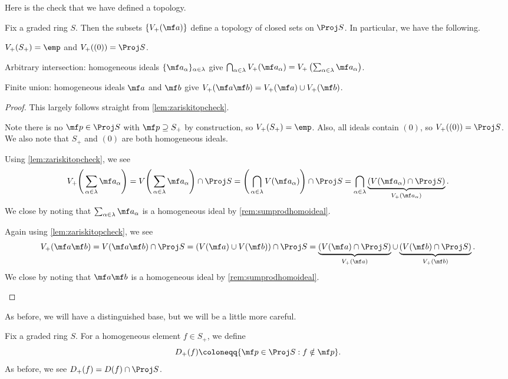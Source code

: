 \documentclass[../notes.tex]{subfiles}
\begin{document}
Here is the check that we have defined a topology.
\begin{lemma} \label{lem:zariskitopcheckproj}
	Fix a graded ring $S$. Then the subsets $\{V_+(\mf a)\}$ define a topology of closed sets on $\Proj S$. In particular, we have the following.
	\begin{listalph}
		\item $V_+(S_+)=\emp$ and $V_+((0))=\Proj S$.
		\item Arbitrary intersection: homogeneous ideals $\{\mf a_\alpha\}_{\alpha\in\lambda}$ give $\bigcap_{\alpha\in\lambda}V_+(\mf a_\alpha)=V_+\left(\sum_{\alpha\in\lambda}\mf a_\alpha\right)$.
		\item Finite union: homogeneous ideals $\mf a$ and $\mf b$ give $V_+(\mf a\mf b)=V_+(\mf a)\cup V_+(\mf b)$.
	\end{listalph}
\end{lemma}
\begin{proof}
	This largely follows straight from \autoref{lem:zariskitopcheck}.
	\begin{listalph}
		\item Note there is no $\mf p\in\Proj S$ with $\mf p\supseteq S_+$ by construction, so $V_+(S_+)=\emp$. Also, all ideals contain $(0)$, so $V_+((0))=\Proj S$. We also note that $S_+$ and $(0)$ are both homogeneous ideals.

		\item Using \autoref{lem:zariskitopcheck}, we see
		\[V_+\Bigg(\sum_{\alpha\in\lambda}\mf a_\alpha\Bigg)=V\Bigg(\sum_{\alpha\in\lambda}\mf a_\alpha\Bigg)\cap\Proj S=\Bigg(\bigcap_{\alpha\in\lambda}V(\mf a_\alpha)\Bigg)\cap\Proj S=\bigcap_{\alpha\in\lambda}\underbrace{(V(\mf a_\alpha)\cap\Proj S)}_{V_+(\mf a_\alpha)}.\]
		We close by noting that $\sum_{\alpha\in\lambda}\mf a_\alpha$ is a homogeneous ideal by \autoref{rem:sumprodhomoideal}.

		\item Again using \autoref{lem:zariskitopcheck}, we see
		\[V_+(\mf a\mf b)=V(\mf a\mf b)\cap\Proj S=(V(\mf a)\cup V(\mf b))\cap\Proj S=\underbrace{(V(\mf a)\cap\Proj S)}_{V_+(\mf a)}\cup\underbrace{(V(\mf b)\cap\Proj S)}_{V_+(\mf b)}.\]
		We close by noting that $\mf a\mf b$ is a homogeneous ideal by \autoref{rem:sumprodhomoideal}.
		\qedhere
	\end{listalph}
\end{proof}
As before, we will have a distinguished base, but we will be a little more careful.
\begin{defihelper} 
	Fix a graded ring $S$. For a homogeneous element $f\in S_+$, we define
	\[D_+(f)\coloneqq\{\mf p\in\Proj S:f\notin\mf p\}.\]
	As before, we see $D_+(f)=D(f)\cap\Proj S$.
\end{defihelper}
\end{document}
